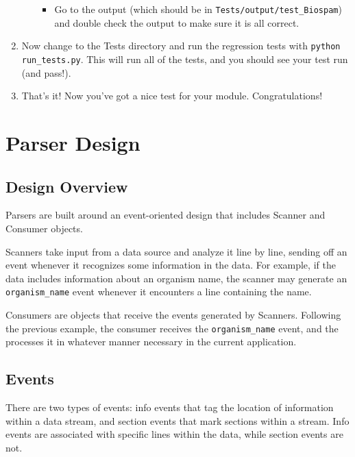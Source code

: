 \documentclass{report}
\begin{document}
\begin{enumerate}
\begin{enumerate}
\begin{itemize}
       \item Go to the output (which should be in \verb|Tests/output/test_Biospam|) and double check the output to make sure it is all correct. 

   \end{itemize}

 \end{enumerate}
       
 \item Now change to the Tests directory and run the regression tests
       with \verb|python run_tests.py|. This will run all of the tests, and
       you should see your test run (and pass!).
       
  \item That's it! Now you've got a nice test for your module.
       Congratulations!
\end{enumerate}


\section{Parser Design}

\subsection{Design Overview}

Parsers are built around an event-oriented design that includes
Scanner and Consumer objects.


Scanners take input from a data source and analyze it line by line,
sending off an event whenever it recognizes some information in the
data.  For example, if the data includes information about an organism
name, the scanner may generate an \verb|organism_name| event whenever it
encounters a line containing the name.


Consumers are objects that receive the events generated by Scanners.
Following the previous example, the consumer receives the
\verb|organism_name| event, and the processes it in whatever manner
necessary in the current application.

\subsection{Events}

There are two types of events: info events that tag the location of
information within a data stream, and section events that mark
sections within a stream.  Info events are associated with specific
lines within the data, while section events are not.
\end{document}
